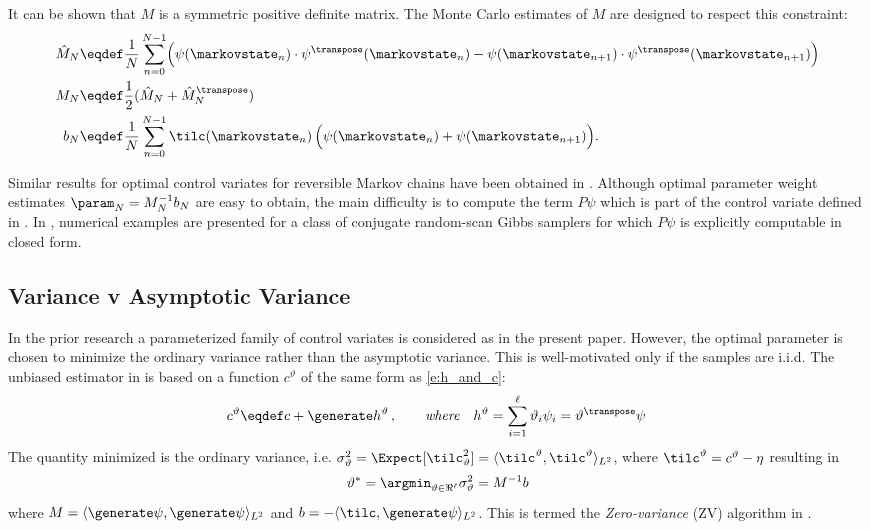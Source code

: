 It can be shown that $M$ is a symmetric positive definite matrix. The Monte Carlo estimates of $M$ are designed to respect this constraint:
\[
\begin{aligned}
\hat{M}_N & \eqdef \frac{1}{N} \sum_{n=0}^{N-1} \Bigl(\psi(\markovstate_n) \cdot\psi^\transpose(\markovstate_n) - \psi(\markovstate_{n+1})\cdot \psi^\transpose(\markovstate_{n+1}) \Bigr) \\
M_N  & \eqdef \frac{1}{2} (\hat{M}_N + \hat{M}_N^\transpose )\\
b_N & \eqdef  \frac{1}{N} \sum_{n=0}^{N-1} \tilc(\markovstate_n)\, \Bigl( \psi(\markovstate_n) + \psi(\markovstate_{n+1}) \Bigr).
\end{aligned}
\]

Similar results for optimal control variates for reversible Markov chains have been obtained in \cite{delkon12}. Although optimal parameter weight estimates $\param_N = M_N^{-1} b_N$ are easy to obtain, the main difficulty is to compute the term $P\psi$ which is part of the control variate defined in . In \cite{delkon12}, numerical examples are presented for a class of conjugate random-scan Gibbs samplers for which $P\psi$ is explicitly computable in closed form.  %


\subsection{Variance v Asymptotic Variance}
In the prior research \cite{oatgircho,papmirgir} a parameterized family of control variates is considered as in the present paper.   However, the optimal parameter is chosen to minimize the ordinary variance rather than the asymptotic variance. This is well-motivated only  if the samples are i.i.d.
The unbiased estimator in \cite{papmirgir} is based on a function $c^{\vartheta}$ of the same form as \eqref{e:h_and_c}:
\[
\begin{aligned}
c^\vartheta  \eqdef c + \generate h^\vartheta \,,
\qquad
\text{\it where}
\quad
h^\vartheta  =  \sum_{i=1}^\ell \vartheta_i \psi_i = \vartheta^\transpose \psi\,
\end{aligned}
\]
The quantity minimized is the ordinary variance, i.e. $\sigma^2_{\vartheta} = \Expect[\tilc^2_{\vartheta}] = \langle \tilc^\vartheta, \tilc^\vartheta \rangle_{L^2}$, where $\tilc^\vartheta = c^\vartheta - \eta$ resulting in
\begin{equation}
\vartheta^*= \argmin_{\vartheta \in \Re^\ell} \sigma^2_{\vartheta}  = M^{-1} b
\label{e:optVar}
\end{equation}
where $M = \langle \generate \psi,  \generate \psi \rangle_{L^2}$ and $b = - \langle \tilc, \generate \psi \rangle_{L^2}$. This is termed the \textit{Zero-variance} (ZV) algorithm in \cite{papmirgir}.

